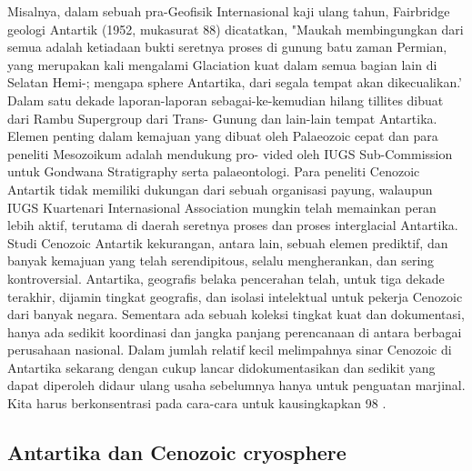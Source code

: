 		Misalnya, dalam sebuah pra-Geofisik Internasional kaji ulang tahun, Fairbridge geologi Antartik (1952, mukasurat 88) dicatatkan, 
	"Maukah membingungkan dari semua adalah ketiadaan bukti seretnya proses di gunung batu zaman Permian, yang merupakan kali mengalami Glaciation 
	kuat dalam semua bagian lain di Selatan Hemi-; mengapa sphere Antartika, dari segala tempat akan dikecualikan.' Dalam satu dekade laporan-laporan 
	sebagai-ke-kemudian hilang tillites dibuat dari Rambu Supergroup dari Trans- Gunung dan lain-lain tempat Antartika. Elemen penting dalam kemajuan yang 
	dibuat oleh Palaeozoic cepat dan para peneliti Mesozoikum adalah mendukung pro- vided oleh IUGS Sub-Commission untuk Gondwana Stratigraphy serta 
	palaeontologi. Para peneliti Cenozoic Antartik tidak memiliki dukungan dari sebuah organisasi payung, walaupun IUGS Kuartenari Internasional Association 
	mungkin telah memainkan peran lebih aktif, terutama di daerah seretnya proses dan proses interglacial Antartika. Studi Cenozoic Antartik kekurangan, 
	antara lain, sebuah elemen prediktif, dan banyak kemajuan yang telah serendipitous, selalu mengherankan, dan sering kontroversial. 
	Antartika, geografis belaka pencerahan telah, untuk tiga dekade terakhir, dijamin tingkat geografis, dan isolasi intelektual untuk pekerja Cenozoic 
	dari banyak negara. Sementara ada sebuah koleksi tingkat kuat dan dokumentasi, hanya ada sedikit koordinasi dan jangka panjang perencanaan di antara 
	berbagai perusahaan nasional. Dalam jumlah relatif kecil melimpahnya sinar Cenozoic di Antartika sekarang dengan cukup lancar didokumentasikan dan 
	sedikit yang dapat diperoleh didaur ulang usaha sebelumnya hanya untuk penguatan marjinal. Kita harus berkonsentrasi pada cara-cara untuk kausingkapkan 
	98%
	\cite{peter1990Antartica}.
	

\subsection{Antartika dan Cenozoic cryosphere}

